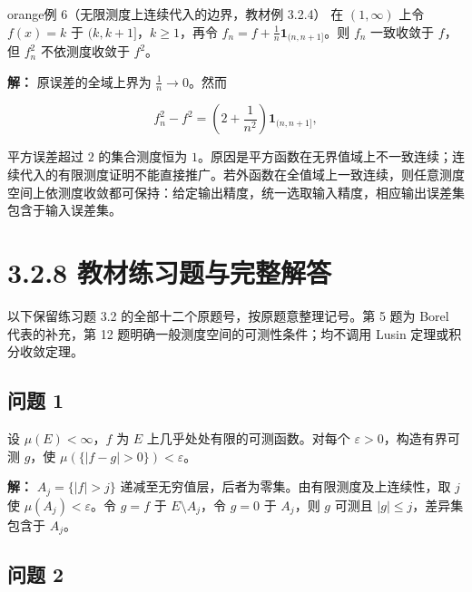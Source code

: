 \documentclass[11pt,a4paper]{article}
\begin{document}
\begin{sboxenv}{orange}{例 6（无限测度上连续代入的边界，教材例 3.2.4）}
在 \((1,\infty)\) 上令 \(f(x)=k\) 于 \((k,k+1]\)，\(k\ge1\)，再令
\(f_n=f+\frac1n\mathbf1_{(n,n+1]}\)。则 \(f_n\) 一致收敛于 \(f\)，但
\(f_n^2\) 不依测度收敛于 \(f^2\)。

\end{sboxenv}

\textbf{解：} 原误差的全域上界为 \(\frac1n\to0\)。然而

\begin{equation*}
f_n^2-f^2=\left(2+\frac1{n^2}\right)\mathbf1_{(n,n+1]},
\end{equation*}

平方误差超过 \(2\) 的集合测度恒为
\(1\)。原因是平方函数在无界值域上不一致连续；连续代入的有限测度证明不能直接推广。若外函数在全值域上一致连续，则任意测度空间上依测度收敛都可保持：给定输出精度，统一选取输入精度，相应输出误差集包含于输入误差集。

\section[\S{}3.2.8
教材练习题与完整解答]{3.2.8
教材练习题与完整解答}\label{ux6559ux6750ux7ec3ux4e60ux9898ux4e0eux5b8cux6574ux89e3ux7b54}

以下保留练习题 3.2 的全部十二个原题号，按原题意整理记号。第 5 题为 Borel
代表的补充，第 12 题明确一般测度空间的可测性条件；均不调用 Lusin
定理或积分收敛定理。

\subsection{问题 1}\label{ux95eeux9898-1}

设 \(\mu(E)<\infty\)，\(f\) 为 \(E\) 上几乎处处有限的可测函数。对每个
\(\varepsilon>0\)，构造有界可测 \(g\)，使
\(\mu(\{|f-g|>0\})<\varepsilon\)。

\textbf{解：} \(A_j=\{|f|>j\}\)
递减至无穷值层，后者为零集。由有限测度及上连续性，取 \(j\) 使
\(\mu(A_j)<\varepsilon\)。令 \(g=f\) 于 \(E\setminus A_j\)，令 \(g=0\)
于 \(A_j\)，则 \(g\) 可测且 \(|g|\le j\)，差异集包含于 \(A_j\)。

\subsection{问题 2}\label{ux95eeux9898-2}
\end{document}
